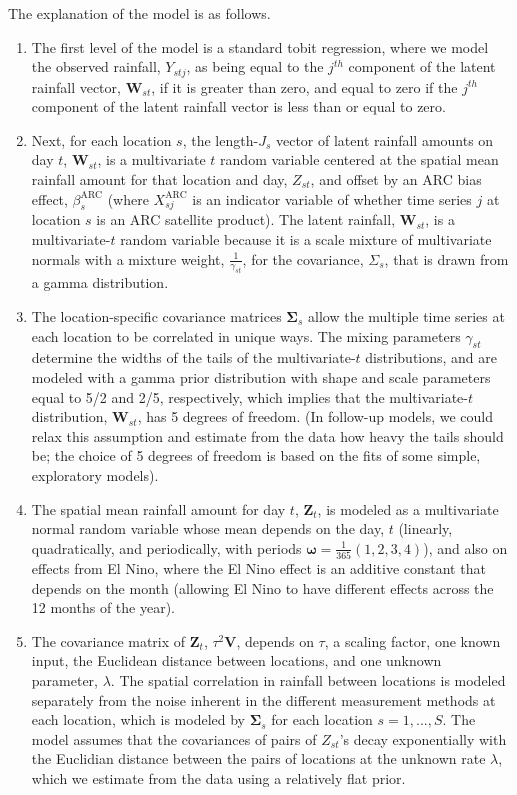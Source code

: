 \documentclass[11pt]{article}
\def\bSigma{\pmb{\Sigma}}
\def\bomega{\pmb{\omega}}
\def\bZ{\pmb{Z}}
\def\bV{\pmb{V}}
\def\bW{\pmb{W}}
\begin{document}
\newpage

The explanation of the model is as follows.
\begin{enumerate}
\item The first level of the model is a standard tobit regression, where we model the observed rainfall, $Y_{stj}$, as being equal to the $j^{th}$ component of the latent rainfall vector, $\bW_{st}$, if it is greater than zero, and equal to zero if the $j^{th}$ component of the latent rainfall vector is less than or equal to zero.
\item Next, for each location $s$, the length-$J_s$ vector of latent rainfall amounts on day $t$, $\bW_{st}$, is a multivariate $t$ random variable centered at the spatial mean rainfall amount for that location and day, $Z_{st}$, and offset by an ARC bias effect, $\beta_s^\text{ARC}$ (where $X^\text{ARC}_{sj}$ is an indicator variable of whether time series $j$ at location $s$ is an ARC satellite product). The latent rainfall, $\bW_{st}$, is a multivariate-$t$ random variable because it is a scale mixture of multivariate normals with a mixture weight, $\frac{1}{\gamma_{st}}$, for the covariance, $\Sigma_s$, that is drawn from a gamma distribution.
\item The location-specific covariance matrices $\bSigma_s$ allow the multiple time series at each location to be correlated in unique ways. The mixing parameters $\gamma_{st}$ determine the widths of the tails of the multivariate-$t$ distributions, and are modeled with a gamma prior distribution with shape and scale parameters equal to 5/2 and 2/5, respectively, which implies that the multivariate-$t$ distribution, $\bW_{st}$, has 5 degrees of freedom. (In follow-up models, we could relax this assumption and estimate from the data how heavy the tails should be; the choice of 5 degrees of freedom is based on the fits of some simple, exploratory models).
\item The spatial mean rainfall amount for day $t$, $\bZ_t$, is modeled as a multivariate normal random variable whose mean depends on the day, $t$ (linearly, quadratically, and periodically, with periods $\bomega = \frac{1}{365}(1, 2, 3, 4)$), and also on effects from El Nino, where the El Nino effect is an additive constant that depends on the month (allowing El Nino to have different effects across the 12 months of the year).
\item The covariance matrix of $\bZ_t$, $\tau^2\bV$, depends on $\tau$, a scaling factor, one known input, the Euclidean distance between locations, and one unknown parameter, $\lambda$. The spatial correlation in rainfall between locations is modeled separately from the noise inherent in the different measurement methods at each location, which is modeled by $\bSigma_s$ for each location $s = 1, ..., S$. The model assumes that the covariances of pairs of $Z_{st}$'s decay exponentially with the Euclidian distance between the pairs of locations at the unknown rate $\lambda$, which we estimate from the data using a relatively flat prior.

\end{enumerate}
\end{document}
